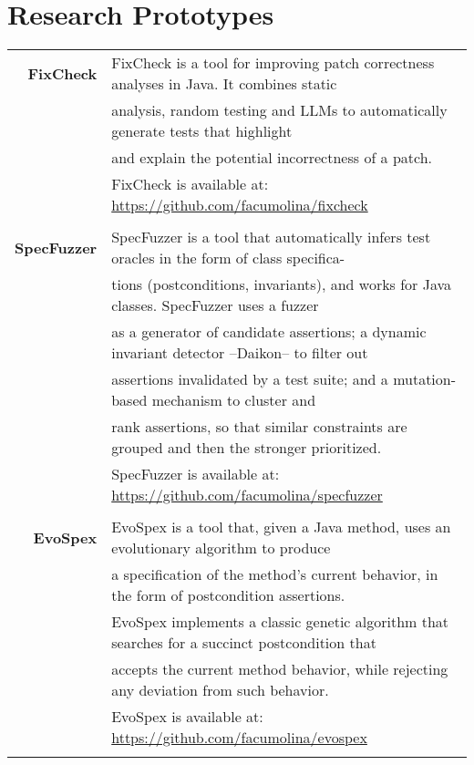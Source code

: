 \documentclass[a4paper,10pt]{article} %
\begin{document}
\section{Research Prototypes}
\begin{longtable}{rl}

\textbf{FixCheck} & FixCheck is a tool for improving patch correctness analyses in Java. It combines static \\ 
& analysis, random testing and LLMs to
automatically generate tests that highlight \\
& and explain the potential incorrectness of a patch. \\ 
& FixCheck is available at: \href{https://github.com/facumolina/fixcheck}{https://github.com/facumolina/fixcheck} \\ & \\

\textbf{SpecFuzzer} & SpecFuzzer is a tool that automatically infers test oracles in the form of class specifica-\\ 
& tions (postconditions, invariants), and works for Java classes. SpecFuzzer uses a fuzzer \\
& as a generator of candidate assertions; a dynamic invariant detector –Daikon– to filter out \\
& assertions invalidated by a test suite; and a mutation-based mechanism to cluster and \\
& rank assertions, so that similar constraints are grouped and then the stronger prioritized. \\ 
& SpecFuzzer is available at: \href{https://github.com/facumolina/specfuzzer}{https://github.com/facumolina/specfuzzer} \\ & \\


\textbf{EvoSpex} & EvoSpex is a tool that, given a Java method, uses an evolutionary algorithm to produce \\ 
& a specification of the method's current behavior, in the form of postcondition assertions. \\
& EvoSpex implements a classic genetic algorithm that searches for a succinct postcondition that \\ 
& accepts the current method behavior, while rejecting any deviation from such behavior. \\ 
& EvoSpex is available at: \href{https://github.com/facumolina/evospex}{https://github.com/facumolina/evospex} \\ & \\


\end{longtable}
\end{document}

